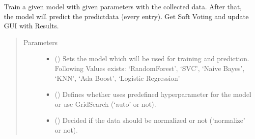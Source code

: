 \documentclass[letterpaper,10pt,english]{sphinxmanual}
\begin{document}
\begin{fulllineitems}
\begin{fulllineitems}
\end{fulllineitems}


\begin{fulllineitems}
\label{\detokenize{anoog.automation:anoog.automation.controller.Terminal.predict}}
\sphinxAtStartPar
Train a given model with given parameters with the collected data.
After that, the model will predict the predict\sphinxhyphen{}data (every entry).
Get Soft Voting and update GUI with Results.
\begin{quote}\begin{description}
\item[{Parameters}] \leavevmode\begin{itemize}
\item {} 
\sphinxAtStartPar
{} () \textendash{} Sets the model which will be used for training and prediction. Following Values exists: ‘RandomForest’, ‘SVC’, ‘Naive Bayes’, ‘KNN’, ‘Ada Boost’, ‘Logistic Regression’

\item {} 
\sphinxAtStartPar
{} () \textendash{} Defines whether uses predefined hyperparameter for the model or use GridSearch (‘auto’ or not).

\item {} 
\sphinxAtStartPar
{} () \textendash{} Decided if the data should be normalized or not (‘normalize’ or not).

\end{itemize}

\end{description}\end{quote}

\end{fulllineitems}



\end{fulllineitems}
\end{document}

